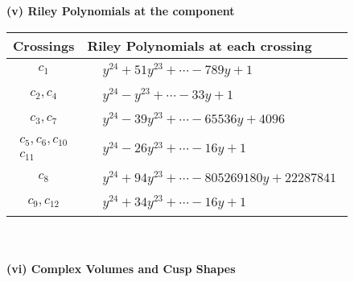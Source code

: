 \documentclass[1p]{elsarticle_modified}
\theoremstyle{definition}
\begin{document}
\newpage\renewcommand{\arraystretch}{1}
\flushleft \textbf{(v) Riley Polynomials at the component}\newline \\
\begin{tabular}{m{50pt}|m{274pt}}
Crossings & \hspace{64pt}Riley Polynomials at each crossing \\
\hline $$\begin{aligned}c_{1}\end{aligned}$$&$\begin{aligned}
&y^{24}+51 y^{23}+\cdots-789 y+1
\end{aligned}$\\
\hline $$\begin{aligned}c_{2},c_{4}\end{aligned}$$&$\begin{aligned}
&y^{24}- y^{23}+\cdots-33 y+1
\end{aligned}$\\
\hline $$\begin{aligned}c_{3},c_{7}\end{aligned}$$&$\begin{aligned}
&y^{24}-39 y^{23}+\cdots-65536 y+4096
\end{aligned}$\\
\hline $$\begin{aligned}c_{5},c_{6},c_{10}\\c_{11}\end{aligned}$$&$\begin{aligned}
&y^{24}-26 y^{23}+\cdots-16 y+1
\end{aligned}$\\
\hline $$\begin{aligned}c_{8}\end{aligned}$$&$\begin{aligned}
&y^{24}+94 y^{23}+\cdots-805269180 y+22287841
\end{aligned}$\\
\hline $$\begin{aligned}c_{9},c_{12}\end{aligned}$$&$\begin{aligned}
&y^{24}+34 y^{23}+\cdots-16 y+1
\end{aligned}$\\
\hline
\end{tabular}\\~\\
\newpage\flushleft \textbf{(vi) Complex Volumes and Cusp Shapes}
\end{document}
